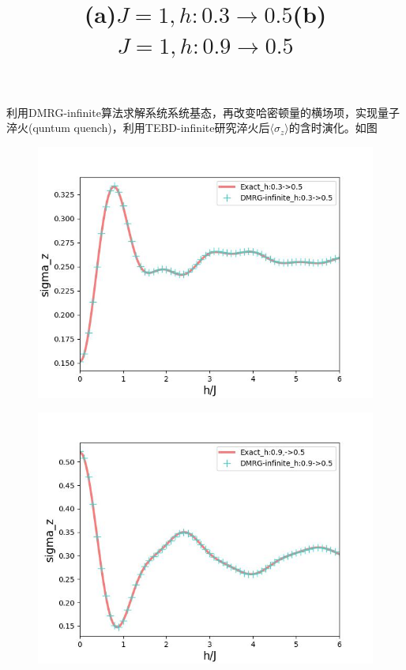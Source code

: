 \documentclass[12pt]{article}
\begin{document}
      利用DMRG-infinite算法求解系统系统基态，再改变哈密顿量的横场项，实现量子淬火(quntum quench)，利用TEBD-infinite研究淬火后$\langle\sigma_z\rangle$的含时演化。如图
      
     \begin{figure}[H]
     	\centering
     	\begin{minipage}{0.49\linewidth}
     		\centering
     		\includegraphics[width=0.9\linewidth]{TFIMSzt1}
     		\title{(a)$J=1,h:0.3\to0.5$}
     		\label{fig:20}
     	\end{minipage}
     	\begin{minipage}{0.49\linewidth}
     		\centering
     		\includegraphics[width=0.9\linewidth]{TFIMSzt2}
     		\title{(b)$J=1,h:0.9\to0.5$}
     		\label{fig:21}
     	\end{minipage}
     	

\end{figure}
\end{document}
